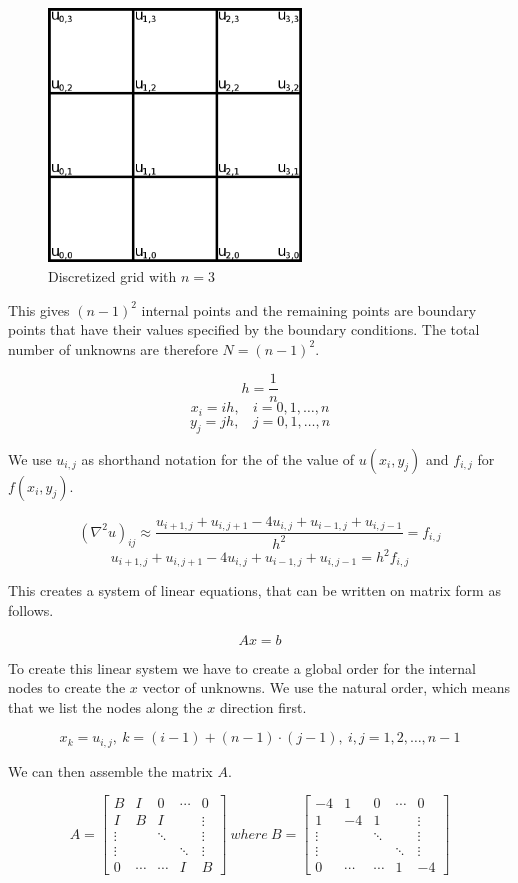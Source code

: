 \begin{figure}[ht]
	\center
	\includegraphics[width=0.6\textwidth]{images/2d_poisson_ex}
	\caption{Discretized grid with $n = 3$}
	\label{fig:discgrid}
\end{figure}

This gives $(n-1)^2$ internal points and the remaining points are boundary
points that have their values specified by the boundary conditions. The total
number of unknowns are therefore $N = (n-1)^2$.

$$h = \frac{1}{n}$$
$$x_i = ih, ~~~~ i = 0, 1, \dots, n$$
$$y_j = jh, ~~~~ j = 0, 1, \dots, n$$

We use $u_{i,j}$ as shorthand notation for the of the value of $u(x_i, y_j)$ and
$f_{i,j}$ for $f(x_i, y_j)$.

$$ (\nabla^2 u)_{ij} \approx \frac{u_{i+1,j} + u_{i,j+1} - 4u_{i,j} + u_{i-1,j} + u_{i,j-1}}{h^2} = f_{i,j} $$
$$ u_{i+1,j} + u_{i,j+1} - 4u_{i,j} + u_{i-1,j} + u_{i,j-1} = h^2 f_{i,j} $$

This creates a system of linear equations, that can be written on matrix form as
follows.

$$Ax = b$$

To create this linear system we have to create a global order for the
internal nodes to create the $x$ vector of unknowns. We use the natural
order, which means that we list the nodes along the $x$ direction first.

$$x_k = u_{i,j}, ~ k = (i-1) + (n-1) \cdot (j-1), ~ i, j = 1, 2, \dots, n-1$$

We can then assemble the matrix $A$.

$$
A = \begin{bmatrix}
 B & I & 0 & \cdots & 0 \\
 I & B & I &   & \vdots \\
 \vdots &   & \ddots &   & \vdots \\
 \vdots &   &   & \ddots & \vdots \\
 0 & \cdots & \cdots & I & B 
\end{bmatrix}
 ~ where ~ 
B = \begin{bmatrix}
-4 & 1 & 0 & \cdots & 0 \\
 1 &-4 & 1 &   & \vdots \\
 \vdots &   & \ddots &   & \vdots \\
 \vdots &   &   & \ddots & \vdots \\
 0 & \cdots & \cdots & 1 &-4 
\end{bmatrix}
$$

